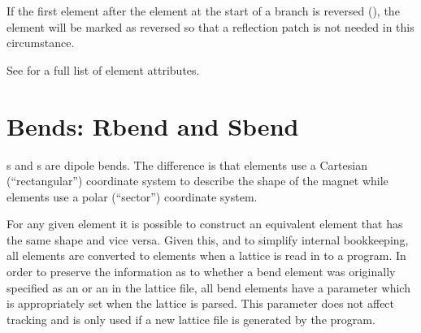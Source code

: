 If the first element after the  element at the start of a branch is reversed
(), the  element will be marked as reversed so that a
reflection patch is not needed in this circumstance.

See  for a full list of element attributes.

\newpage

\section{Bends: Rbend and Sbend}
\label{s:bend}

s and s are dipole bends. The difference is that  elements use a
Cartesian (``rectangular'') coordinate system to describe the shape of the magnet while 
elements use a polar (``sector'') coordinate system. 

For any given  element it is possible to construct an equivalent  element that
has the same shape and vice versa. Given this, and to simplify internal bookkeeping, all 
elements are converted to  elements when a lattice is read in to a program.  In order to
preserve the information as to whether a bend element was originally specified as an  or
an  in the lattice file, all bend elements have a  parameter which is
appropriately set when the lattice is parsed. This  parameter does not affect tracking and
is only used if a new lattice file is generated by the program.

